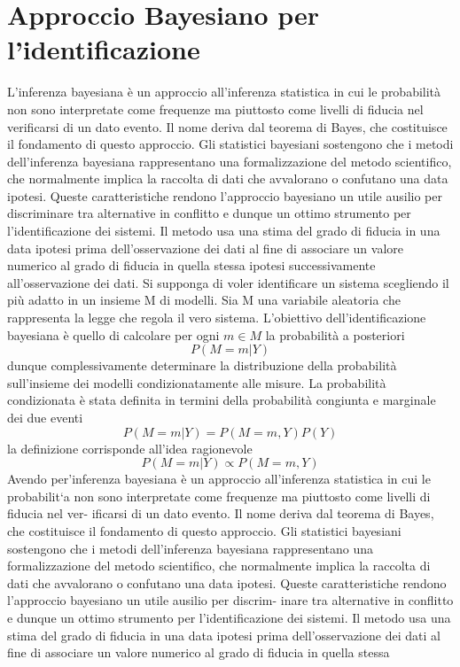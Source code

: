 \documentclass[10pt,a4paper,oneside,openany]{book}
\begin{document}
\section{Approccio Bayesiano per l’identificazione}
L’inferenza bayesiana è un approccio all’inferenza statistica in cui le probabilità
non sono interpretate come frequenze ma piuttosto come livelli di fiducia nel verificarsi di un dato evento. Il nome deriva dal teorema di Bayes, che costituisce il
fondamento di questo approccio. Gli statistici bayesiani sostengono che i metodi
dell’inferenza bayesiana rappresentano una formalizzazione del metodo scientifico,
che normalmente implica la raccolta di dati che avvalorano o confutano una data
ipotesi.
Queste caratteristiche rendono l’approccio bayesiano un utile ausilio per discriminare tra alternative in conflitto e dunque un ottimo strumento per l’identificazione
dei sistemi.
Il metodo usa una stima del grado di fiducia in una data ipotesi prima dell’osservazione
dei dati al fine di associare un valore numerico al grado di fiducia in quella stessa
ipotesi successivamente all’osservazione dei dati. Si supponga di voler identificare
un sistema scegliendo il più adatto in un insieme M di modelli.
Sia M una variabile aleatoria che rappresenta la legge che regola il vero sistema.
L’obiettivo dell’identificazione bayesiana è quello di calcolare per ogni $m\in M$ la
probabilità a posteriori
\[P (M = m|Y )\]
dunque complessivamente determinare la distribuzione della probabilità sull’insieme
dei modelli condizionatamente alle misure.
La probabilità condizionata è stata definita in termini della probabilità congiunta e
marginale dei due eventi
\[P (M = m|Y ) =
P (M = m, Y )
P (Y )\]
la definizione corrisponde all’idea ragionevole
\[P (M = m|Y ) \propto P (M = m, Y )\]
Avendo per’inferenza bayesiana è un approccio all’inferenza statistica in cui le probabilit`a
non sono interpretate come frequenze ma piuttosto come livelli di fiducia nel ver-
ificarsi di un dato evento. Il nome deriva dal teorema di Bayes, che costituisce il
fondamento di questo approccio. Gli statistici bayesiani sostengono che i metodi
dell’inferenza bayesiana rappresentano una formalizzazione del metodo scientifico,
che normalmente implica la raccolta di dati che avvalorano o confutano una data
ipotesi.
Queste caratteristiche rendono l’approccio bayesiano un utile ausilio per discrim-
inare tra alternative in conflitto e dunque un ottimo strumento per l’identificazione
dei sistemi.
Il metodo usa una stima del grado di fiducia in una data ipotesi prima dell’osservazione
dei dati al fine di associare un valore numerico al grado di fiducia in quella stessa
\end{document}
